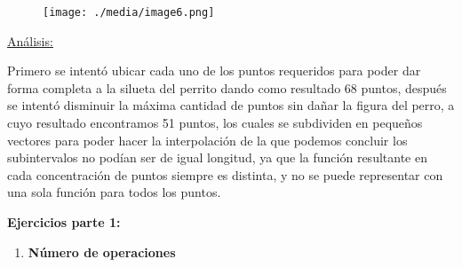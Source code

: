 \documentclass[12pt]{article}
\renewcommand{\_}{\kern-1.5pt\textunderscore\kern-1.5pt}
\begin{document}

\begin{figure}[H]
	\begin{Center}
		\texttt{[image: ./media/image6.png]}
	\end{Center}
\end{figure}



\par

\begin{adjustwidth}{0.5in}{0.0in}
\begin{justify}
\uline{Análisis:}{\fontsize{10pt}{12.0pt}\selectfont  \par}
\end{justify}\par

\end{adjustwidth}


\vspace{\baselineskip}
\begin{justify}
{\fontsize{10pt}{12.0pt}\selectfont Primero se intentó ubicar cada uno de los puntos requeridos para poder dar forma completa a la silueta del perrito dando como resultado 68 puntos, después se intentó disminuir la máxima cantidad de puntos sin dañar la figura del perro, a cuyo resultado encontramos 51 puntos, los cuales se subdividen en pequeños vectores para poder hacer la interpolación de la que podemos concluir los subintervalos no podían ser de igual longitud, ya que la función resultante en cada concentración de puntos siempre es distinta, y no se puede representar con una sola función para todos los puntos.\par}
\end{justify}\par


\vspace{\baselineskip}

\vspace{\baselineskip}
\begin{justify}
\textbf{Ejercicios parte 1:}
\end{justify}\par

\begin{enumerate}
	\item \textbf{Número de operaciones}
\end{enumerate}\par
\end{document}
